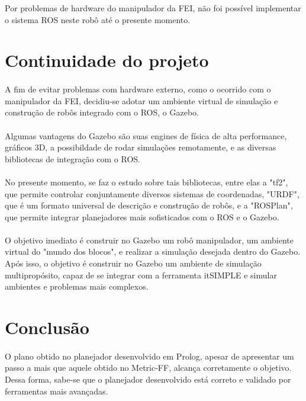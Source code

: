 \documentclass[12pt,titlepage]{article}
\begin{document}
	Por problemas de hardware do manipulador da FEI, não foi possível implementar o sistema ROS neste robô até o presente momento.

\section{Continuidade do projeto}
\paragraph{}

	A fim de evitar problemas com hardware externo, como o ocorrido com o manipulador da FEI, decidiu-se adotar um ambiente virtual de simulação e construção de robôs integrado com o ROS, o Gazebo.
	\paragraph{}

	Algumas vantagens do Gazebo são suas engines de física de alta performance, gráficos 3D, a possibildade de rodar simulações remotamente, e as diversas bibliotecas de integração com o ROS.
	\paragraph{}

	No presente momento, se faz o estudo sobre tais bibliotecas, entre elas a "tf2", que permite controlar conjuntamente diversos sistemas de coordenadas, "URDF", que é um formato universal de descrição e construção de robôs, e a "ROSPlan", que permite integrar planejadores mais sofisticados com o ROS e o Gazebo.
	\paragraph{}

	O objetivo imediato é construir no Gazebo um robô manipulador, um ambiente virtual do "mundo dos blocos", e realizar a simulação desejada dentro do Gazebo. Após isso, o objetivo é construir no Gazebo um ambiente de simulação multipropósito, capaz de se integrar com a ferramenta itSIMPLE e simular ambientes e problemas mais complexos.

\section{Conclusão}

	\paragraph{}
	O plano obtido no planejador desenvolvido em Prolog, apesar de apresentar um passo a mais que aquele obtido no Metric-FF, alcança corretamente o objetivo. Dessa forma, sabe-se que o planejador desenvolvido está correto e validado por ferramentas mais avançadas.
\end{document}
